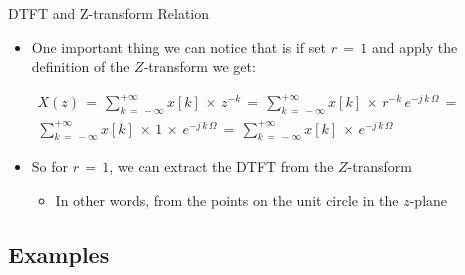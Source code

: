 \begin{frame}[t,allowframebreaks]{DTFT and Z-transform Relation}

\begin{itemize}

\item One important thing we can notice that is if set $r \, = \, 1$ and apply the definition of the $Z$-transform we get:

$\begin{array}{rcl}
X(z) \, = \, \displaystyle\sum_{k \, = \, - \infty}^{+ \infty} x[k] \, \times \, z^{-k} \, = \, \displaystyle\sum_{k \, = \, - \infty}^{+ \infty} x[k] \, \times \, r^{-k} \, e^{-j \, k \, \Omega} \, = \, \\ \displaystyle\sum_{k \, = \, - \infty}^{+ \infty} x[k] \, \times \, 1 \, \times  \, e^{-j \, k \, \Omega} \, = \,
\displaystyle\sum_{k \, = \, - \infty}^{+ \infty} x[k] \, \times \, e^{-j \, k \, \Omega}  
\end{array}$

\item So for $r \, = \, 1$, we can extract the DTFT from the $Z$-transform

	\begin{itemize}
	\item In other words, from the points on the unit circle in the $z$-plane
	\end{itemize}

\end{itemize}


\end{frame}


\subsection{Examples}

